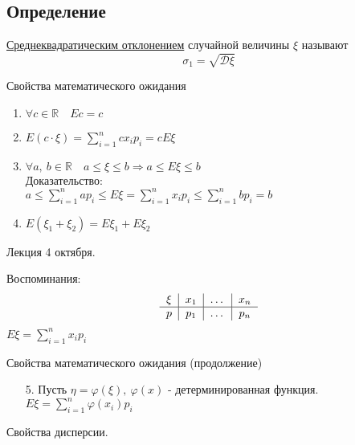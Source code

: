 \documentclass[12pt, a4paper]{article}
\begin{document}
    \subsection*{Определение}
    \underline{Среднеквадратическим отклонением} случайной величины $\xi$ называют
    \[\sigma_1 = \sqrt{\mathcal{D}\xi}\]
    \begin{center}
        Свойства математического ожидания
    \end{center}
    \begin{enumerate}
        \item $\forall c\in \mathbb{R}\quad Ec = c$
        \item $E(c\cdot \xi) =\displaystyle \sum_{i = 1}^{n} cx_i p_i = cE\xi$
        \item $\forall a,\ b\in \mathbb{R}\quad a \leq \xi \leq b\Rightarrow a \leq E\xi \leq b$\\
        Доказательство:\\
        $\displaystyle a \leq \sum_{i = 1}^{n} ap_i \leq E\xi = \sum_{i = 1}^{n} x_i p_i \leq \sum_{i = 1}^{n} b p_i = b$
        \item $E(\xi_1 + \xi_2) = E\xi_1 + E\xi_2$
    \end{enumerate}
    \begin{center}
        Лекция 4 октября.
    \end{center}
    Воспоминания:
    \[\begin{tabular}{c|c|c|c}
        $\xi$ & $x_1$ & $\dots$ & $x_n$\\
        \hline
        $p$ & $p_1$ & $\dots$ & $p_n$
     \end{tabular}\]
     $E\xi = \displaystyle \sum\limits_{i = 1}^{n} x_i p_i$
     \begin{center}
        Свойства математического ожидания (продолжение)
     \end{center}
     \begin{enumerate}
        \item[5.] Пусть $\eta = \varphi(\xi),\ \varphi(x)$ - детерминированная функция.\\
        $E\xi = \displaystyle\sum\limits_{i = 1}^{n} \varphi(x_i) p_i$
     \end{enumerate}
     \begin{center}
        Свойства дисперсии.
     \end{center}
\end{document}
